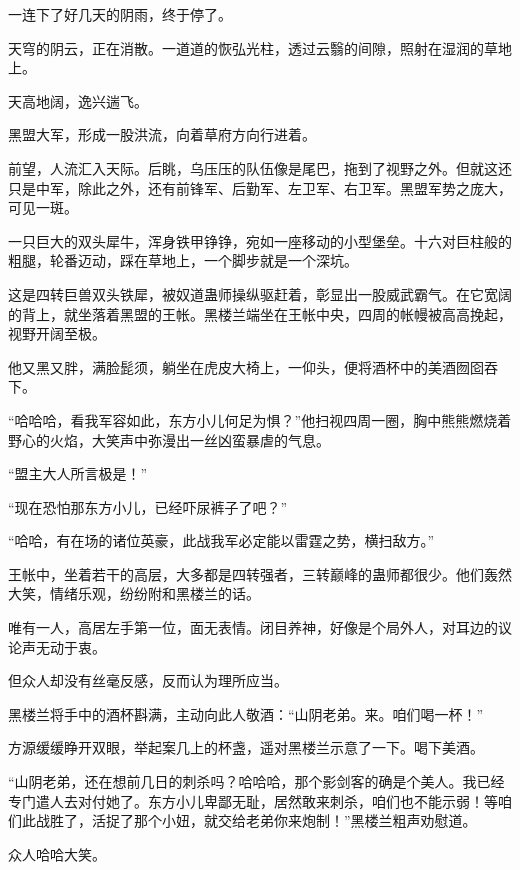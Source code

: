 
\begin{this_body}



一连下了好几天的阴雨，终于停了。

天穹的阴云，正在消散。一道道的恢弘光柱，透过云翳的间隙，照射在湿润的草地上。

天高地阔，逸兴遄飞。

黑盟大军，形成一股洪流，向着草府方向行进着。

前望，人流汇入天际。后眺，乌压压的队伍像是尾巴，拖到了视野之外。但就这还只是中军，除此之外，还有前锋军、后勤军、左卫军、右卫军。黑盟军势之庞大，可见一斑。

一只巨大的双头犀牛，浑身铁甲铮铮，宛如一座移动的小型堡垒。十六对巨柱般的粗腿，轮番迈动，踩在草地上，一个脚步就是一个深坑。

这是四转巨兽双头铁犀，被奴道蛊师操纵驱赶着，彰显出一股威武霸气。在它宽阔的背上，就坐落着黑盟的王帐。黑楼兰端坐在王帐中央，四周的帐幔被高高挽起，视野开阔至极。

他又黑又胖，满脸髭须，躺坐在虎皮大椅上，一仰头，便将酒杯中的美酒囫囵吞下。

“哈哈哈，看我军容如此，东方小儿何足为惧？”他扫视四周一圈，胸中熊熊燃烧着野心的火焰，大笑声中弥漫出一丝凶蛮暴虐的气息。

“盟主大人所言极是！”

“现在恐怕那东方小儿，已经吓尿裤子了吧？”

“哈哈，有在场的诸位英豪，此战我军必定能以雷霆之势，横扫敌方。”

王帐中，坐着若干的高层，大多都是四转强者，三转巅峰的蛊师都很少。他们轰然大笑，情绪乐观，纷纷附和黑楼兰的话。

唯有一人，高居左手第一位，面无表情。闭目养神，好像是个局外人，对耳边的议论声无动于衷。

但众人却没有丝毫反感，反而认为理所应当。

黑楼兰将手中的酒杯斟满，主动向此人敬酒：“山阴老弟。来。咱们喝一杯！”

方源缓缓睁开双眼，举起案几上的杯盏，遥对黑楼兰示意了一下。喝下美酒。

“山阴老弟，还在想前几日的刺杀吗？哈哈哈，那个影剑客的确是个美人。我已经专门遣人去对付她了。东方小儿卑鄙无耻，居然敢来刺杀，咱们也不能示弱！等咱们此战胜了，活捉了那个小妞，就交给老弟你来炮制！”黑楼兰粗声劝慰道。

众人哈哈大笑。


\end{this_body}
